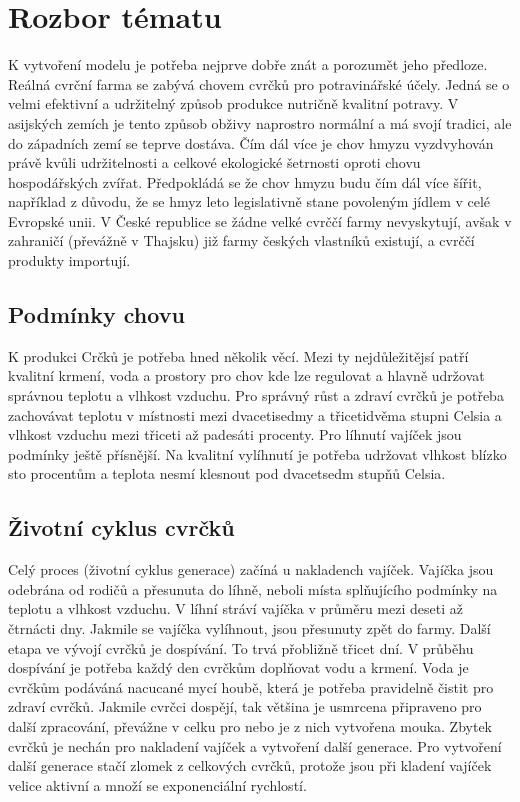 \documentclass[a4paper, 12pt]{article}
\begin{document}
\section{Rozbor tématu}
K vytvoření modelu je potřeba nejprve dobře znát a porozumět jeho předloze. Reálná cvrční farma se zabývá chovem cvrčků pro potravinářské účely. Jedná se o velmi efektivní a udržitelný způsob produkce nutričně kvalitní potravy. V asijských zemích je tento způsob obživy naprostro normální a má svojí tradici, ale do západních zemí se teprve dostáva. Čím dál více je chov hmyzu vyzdvyhován právě kvůli udržitelnosti a celkové ekologické šetrnosti oproti chovu hospodářských zvířat. Předpokládá se že chov hmyzu budu čím dál více šířit, například z důvodu, že se hmyz leto legislativně stane povoleným jídlem v celé Evropské unii. V České republice se žádne velké cvrččí farmy nevyskytují, avšak v zahraničí (převážně v Thajsku) již farmy českých vlastníků existují, a cvrččí produkty importují. 

\subsection{Podmínky chovu}
K produkci Crčků je potřeba hned několik věcí. Mezi ty nejdůležitějsí patří kvalitní krmení, voda a prostory pro chov kde lze regulovat a hlavně udržovat správnou teplotu a vlhkost vzduchu. Pro správný růst a zdraví cvrčků je potřeba zachovávat teplotu v místnosti mezi dvacetisedmy a třicetidvěma stupni Celsia a vlhkost vzduchu mezi třiceti až padesáti procenty. Pro líhnutí vajíček jsou podmínky ještě přísnější. Na kvalitní vylíhnutí je potřeba udržovat vlhkost blízko sto procentům a teplota nesmí klesnout pod dvacetsedm stupňů Celsia. 

\subsection{Životní cyklus cvrčků}
Celý proces (životní cyklus generace) začíná u nakladench vajíček. Vajíčka jsou odebrána od rodičů a přesunuta do líhně, neboli místa splňujícího podmínky na teplotu a vlhkost vzduchu. V líhní stráví vajíčka v průměru mezi deseti až čtrnácti dny. Jakmile se vajíčka vylíhnout, jsou přesunuty zpět do farmy. Další etapa ve vývojí cvrčků je dospívání. To trvá přobližně třicet dní. V průběhu dospívání je potřeba každý den cvrčkům doplňovat vodu a krmení. Voda je cvrčkům podáváná nacucané mycí houbě, která je potřeba pravidelně čistit pro zdraví cvrčků. Jakmile cvrčci dospějí, tak většina je usmrcena připraveno pro další zpracování, převážne v celku pro nebo je z nich vytvořena mouka. Zbytek cvrčků je nechán pro nakladení vajíček a vytvoření další generace. Pro vytvoření další generace stačí zlomek z celkových cvrčků, protože jsou při kladení vajíček velice aktivní a množí se exponenciální rychlostí. 
\end{document}
